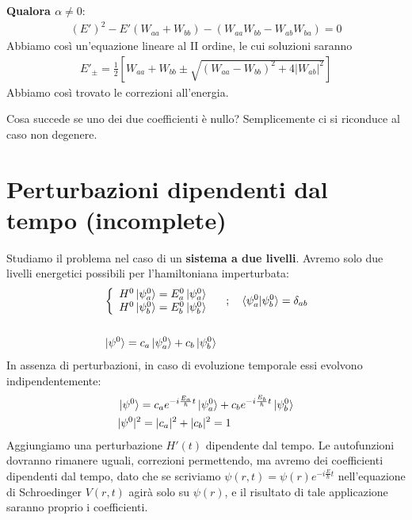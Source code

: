 \newpage

\textbf{Qualora $\alpha \neq 0$}:
\begin{align}
(E')^2 - E'(W_{aa} + W_{bb}) - (W_{aa}W_{bb} - W_{ab}W_{ba})=0
\end{align}
Abbiamo così un'equazione lineare al II ordine, le cui soluzioni saranno
\begin{align}
E'_\pm = \frac{1}{2} [W_{aa} + W_{bb} \pm \sqrt{(W_{aa}-W_{bb})^2 + 4|W_{ab}|^2}]
\end{align}
Abbiamo così trovato le correzioni all'energia.

Cosa succede se uno dei due coefficienti è nullo? Semplicemente ci si riconduce al caso non degenere.

\section{Perturbazioni dipendenti dal tempo (incomplete)}

Studiamo il problema nel caso di un \textbf{sistema a due livelli}. Avremo solo due livelli energetici possibili per l'hamiltoniana imperturbata:
\begin{align}
{}&\left\{\begin{array}{cc}
H^0\ket{\psi^0_a}= E_a^0\ket{\psi^0_a} \\
H^0\ket{\psi^0_b}= E_b^0\ket{\psi^0_b}
\end{array}
\right. \quad;\quad \braket{\psi_a^0 |\psi_b^0}= \delta_{ab} \\
\nonumber \\
&\ket{\psi^0}= c_a\ket{\psi^0_a} + c_b\ket{\psi^0_b}
\end{align}
In assenza di perturbazioni, in caso di evoluzione temporale essi evolvono indipendentemente:
\begin{align}
{}&\ket{\psi^0}= c_a e^{-i \frac{E_a}{\hbar}t} \ket{\psi^0_a} + c_b e^{-i \frac{E_b}{\hbar}t} \ket{\psi^0_b} \\
&|\psi^0|^2= |c_a|^2 + |c_b|^2=1
\end{align}
Aggiungiamo una perturbazione $H'(t)$ dipendente dal tempo. Le autofunzioni dovranno rimanere uguali, correzioni permettendo, ma avremo dei coefficienti dipendenti dal tempo, dato che se scriviamo $\psi(r,t) = \psi(r)e^{-i \frac{E}{\hbar}t}$ nell'equazione di Schroedinger $V(r,t)$ agirà solo su $\psi(r)$, e il risultato di tale applicazione saranno proprio i coefficienti.

